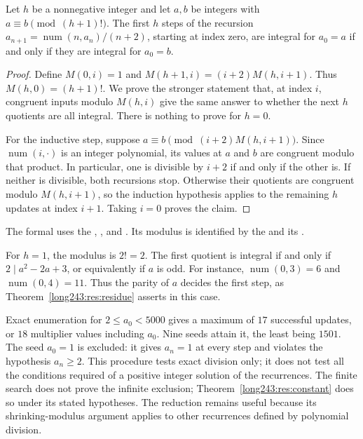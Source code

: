 \documentclass[11pt]{article}
\newcommand{\fnum}{\operatorname{num}}
\begin{document}
\begin{theorem}\label{long243:res:residue}
Let $h$ be a nonnegative integer and let $a,b$ be integers with $a\equiv b\pmod{(h+1)!}$.
The first $h$ steps of the recursion
$a_{n+1}=\fnum(n,a_n)/(n+2)$, starting at index zero, are integral
for $a_0=a$ if and only if they are integral for $a_0=b$.
\end{theorem}

\begin{proof}
Define $M(0,i)=1$ and $M(h+1,i)=(i+2)M(h,i+1)$. Thus
$M(h,0)=(h+1)!$. We prove the stronger statement that, at index $i$,
congruent inputs modulo $M(h,i)$ give the same answer to whether the
next $h$ quotients are all integral.
There is nothing to prove for $h=0$.

For the inductive step, suppose
$a\equiv b\pmod{(i+2)M(h,i+1)}$. Since $\fnum(i,\cdot)$ is an integer
polynomial, its values at $a$ and $b$ are congruent modulo that product.
In particular, one is divisible by $i+2$ if and only if the other is.
If neither is divisible, both recursions stop. Otherwise their quotients
are congruent modulo $M(h,i+1)$, so the induction hypothesis applies
to the remaining $h$ updates at index $i+1$. Taking $i=0$ proves the claim.
\end{proof}

\noindent The formal
 uses the
,
, and
. Its modulus is identified by the
 and its
.

For $h=1$, the modulus is $2!=2$. The first quotient is integral
if and only if $2\mid a^2-2a+3$, or equivalently if $a$ is odd.
For instance, $\fnum(0,3)=6$ and $\fnum(0,4)=11$. Thus the parity
of $a$ decides the first step, as Theorem~\ref{long243:res:residue}
asserts in this case.

Exact enumeration for $2\le a_0<5000$ gives a maximum of $17$
successful updates, or $18$ multiplier values including $a_0$.
Nine seeds attain it, the least being $1501$. The seed $a_0=1$ is excluded:
it gives $a_n=1$ at every step and violates the hypothesis $a_n\ge2$.
This procedure tests exact division only; it does not test all the
conditions required of a positive integer solution of the recurrences. The finite search does not prove the infinite exclusion;
Theorem~\ref{long243:res:constant} does so under its stated hypotheses.
The reduction remains useful because its shrinking-modulus argument
applies to other recurrences defined by polynomial division.
\end{document}
